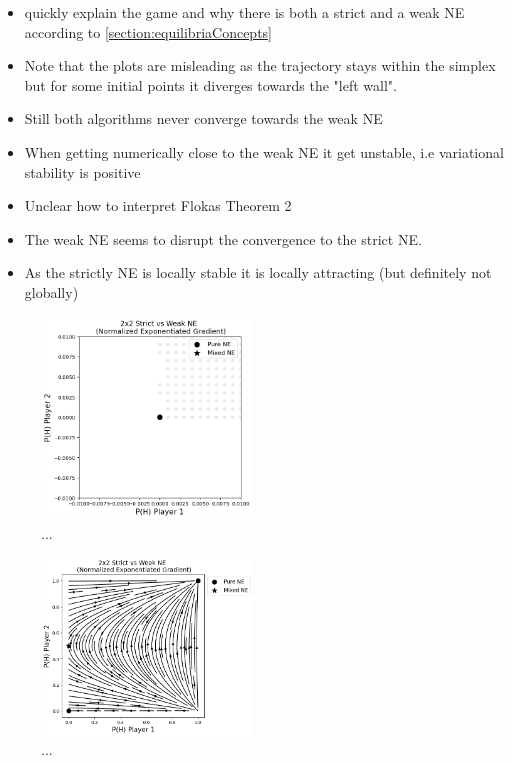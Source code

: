 \begin{itemize}
    \item quickly explain the game and why there is both a strict and a weak NE according to \ref{section:equilibriaConcepts}
    \item Note that the plots are misleading as the trajectory stays within the simplex but for some initial points
    it diverges towards the "left wall". 
    \item Still both algorithms never converge towards the weak NE
    \item When getting numerically close to the weak NE it get unstable, i.e variational stability is positive
    \item Unclear how to interpret \cite{flokas} Flokas Theorem 2 
    \item The weak NE seems to disrupt the convergence to the strict NE. 
    \item As the strictly NE is locally stable it is locally attracting (but definitely not globally)
\end{itemize}

\begin{figure}
    \centering
    \includegraphics[width=0.5\textwidth]{logos/Weak1.png}
    \caption{...}
    \label{fig:Weak1}
\end{figure}

\begin{figure}
    \centering
    \includegraphics[width=0.5\textwidth]{logos/Weak2.png}
    \caption{...}
    \label{fig:Weak2}
\end{figure}

